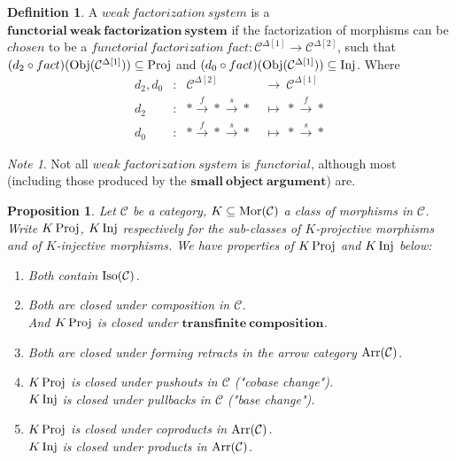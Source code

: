 \documentclass[a4paper]{article}
\theoremstyle{plain}
\newtheorem{prop}[thm]{Proposition}
\theoremstyle{definition}
\newtheorem{defn}{Definition}[section]
\theoremstyle{remark}
\newtheorem*{note}{Note}
\newcommand{\mc}[1]{\mathcal{#1}}
\newcommand{\mbf}[1]{\mathbf{#1}}
\newcommand{\mcC}{\mc C}
\DeclareMathOperator{\Mor}{\rm{Mor}}
\DeclareMathOperator{\Obj}{\rm{Obj}}
\DeclareMathOperator{\Proj}{\rm{Proj}}
\DeclareMathOperator{\Inj}{\rm{Inj}}
\DeclareMathOperator{\Arr}{\rm{Arr}}
\DeclareMathOperator{\Iso}{\rm{Iso}}
\begin{document}
    \begin{defn} 
        A $weak\ factorization\ system$ is a $\mbf{functorial\ weak\ factorization\ system}$
        if the factorization of morphisms can be $chosen$ to be a $functorial\ factorization\ fact : \mcC^{\Delta[1]} \to \mcC^{\Delta[2]}$,
        such that $(d_2 \circ fact) (\Obj(\mcC^{\Delta[1]})) \subseteq \Proj$ and $(d_0 \circ fact) (\Obj(\mcC^{\Delta[1]})) \subseteq \Inj$.
        Where
        \begin{align*}
            d_2, d_0 &: &\mcC^{\Delta[2]} &\ \longrightarrow \ \mcC^{\Delta[1]}\\
            d_2 &: &\ast \overset{f}{\to} \ast \overset{s}{\to} \ast
                &\ \longmapsto \ \ast \overset{f}{\to} \ast\\
            d_0 &: &\ast \overset{f}{\to} \ast \overset{s}{\to} \ast
                &\ \longmapsto \ \ast \overset{s}{\to} \ast
        \end{align*}

    \end{defn}

    \begin{note}
        Not all $weak\ factorization\ system$ is $functorial$,
        although most (including those produced by the $\mbf{small\ object\ argument}$) are.
    \end{note}

    \begin{prop}
        Let $\mcC$ be a category, $K \subseteq \Mor(\mcC)$ a class of morphisms in $\mcC$.
        Write $K \Proj$, $K \Inj$ respectively for
        the sub-classes of $K$-projective morphisms
        and of $K$-injective morphisms.
        We have properties of $K \Proj$ and $K \Inj$ below:
        \begin{enumerate}
            \item Both contain $\Iso(\mcC)$.
            \item Both are closed under composition in $\mcC$.\\
                And $K \Proj$ is closed under $\mbf{transfinite\ composition}$.
            \item Both are closed under forming retracts in the arrow category $\Arr(\mcC)$.
            \item $K \Proj$ is closed under pushouts in $\mcC$ ("cobase change").\\
                $K \Inj$ is closed under pullbacks in $\mcC$ ("base change").
            \item $K \Proj$ is closed under coproducts in $\Arr(\mcC)$.\\
                $K \Inj$ is closed under products in $\Arr(\mcC)$.
        \end{enumerate}
    \end{prop}
\end{document}
